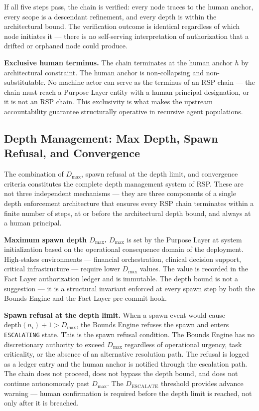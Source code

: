 If all five steps pass, the chain is verified: every node traces to the human anchor, every scope is a descendant refinement, and every depth is within the architectural bound. The verification outcome is identical regardless of which node initiates it --- there is no self-serving interpretation of authorization that a drifted or orphaned node could produce.

\medskip
\noindent\textbf{Exclusive human terminus.} The chain terminates at the human anchor $h$ by architectural constraint. The human anchor is non-collapsing and non-substitutable. No machine actor can serve as the terminus of an RSP chain --- the chain must reach a Purpose Layer entity with a human principal designation, or it is not an RSP chain. This exclusivity is what makes the \bxthree{} upstream accountability guarantee structurally operative in recursive agent populations.

\subsection{Depth Management: Max Depth, Spawn Refusal, and Convergence}
\label{sec:rs-depth-mgmt}

The combination of $D_{\max}$, spawn refusal at the depth limit, and convergence criteria constitutes the complete depth management system of RSP. These are not three independent mechanisms --- they are three components of a single depth enforcement architecture that ensures every RSP chain terminates within a finite number of steps, at or before the architectural depth bound, and always at a human principal.

\medskip
\noindent\textbf{Maximum spawn depth $D_{\max}$.} $D_{\max}$ is set by the Purpose Layer at system initialization based on the operational consequence domain of the deployment. High-stakes environments --- financial orchestration, clinical decision support, critical infrastructure --- require lower $D_{\max}$ values. The value is recorded in the Fact Layer authorization ledger and is immutable. The depth bound is not a suggestion --- it is a structural invariant enforced at every spawn step by both the Bounds Engine and the Fact Layer pre-commit hook.

\medskip
\noindent\textbf{Spawn refusal at the depth limit.} When a spawn event would cause $\text{depth}(n_i) + 1 > D_{\max}$, the Bounds Engine refuses the spawn and enters \texttt{ESCALATING} state. This is the spawn refusal condition. The Bounds Engine has no discretionary authority to exceed $D_{\max}$ regardless of operational urgency, task criticality, or the absence of an alternative resolution path. The refusal is logged as a ledger entry and the human anchor is notified through the escalation path. The chain does not proceed, does not bypass the depth bound, and does not continue autonomously past $D_{\max}$. The $D_{\text{ESCALATE}}$ threshold provides advance warning --- human confirmation is required before the depth limit is reached, not only after it is breached.

